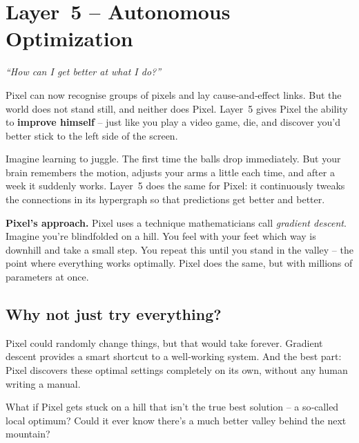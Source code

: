 \section{Layer~5 – Autonomous Optimization}
\label{sec:layer5}

\begin{tcolorbox}[colback=blue!5, colframe=blue!60, title=\textbf{Superpower: The Optimiser}]
\begin{center}
\textit{“How can I get better at what I do?”}
\end{center}
\end{tcolorbox}

Pixel can now recognise groups of pixels and lay cause‑and‑effect links.
But the world does not stand still, and neither does Pixel.  Layer~5
gives Pixel the ability to \textbf{improve himself} – just like you
play a video game, die, and discover you’d better stick to the left
side of the screen.

\begin{tcolorbox}[colback=yellow!5, colframe=yellow!80, title=Real‑life analogy]
Imagine learning to juggle.  The first time the balls drop immediately.
But your brain remembers the motion, adjusts your arms a little each
time, and after a week it suddenly works.  Layer~5 does the same for
Pixel: it continuously tweaks the connections in its hypergraph so that
predictions get better and better.
\end{tcolorbox}

\textbf{Pixel’s approach.}
Pixel uses a technique mathematicians call \emph{gradient descent}.
Imagine you’re blindfolded on a hill.  You feel with your feet which
way is downhill and take a small step.  You repeat this until you
stand in the valley – the point where everything works optimally.
Pixel does the same, but with millions of parameters at once.

\subsection*{Why not just try everything?}

Pixel could randomly change things, but that would take forever.
Gradient descent provides a smart shortcut to a well‑working system.
And the best part: Pixel discovers these optimal settings completely
on its own, without any human writing a manual.

\begin{tcolorbox}[colback=orange!5, colframe=orange!60, title=\textbf{What if...?}]
What if Pixel gets stuck on a hill that isn’t the true best solution –
a so‑called local optimum?  Could it ever know there’s a much better
valley behind the next mountain?
\end{tcolorbox}